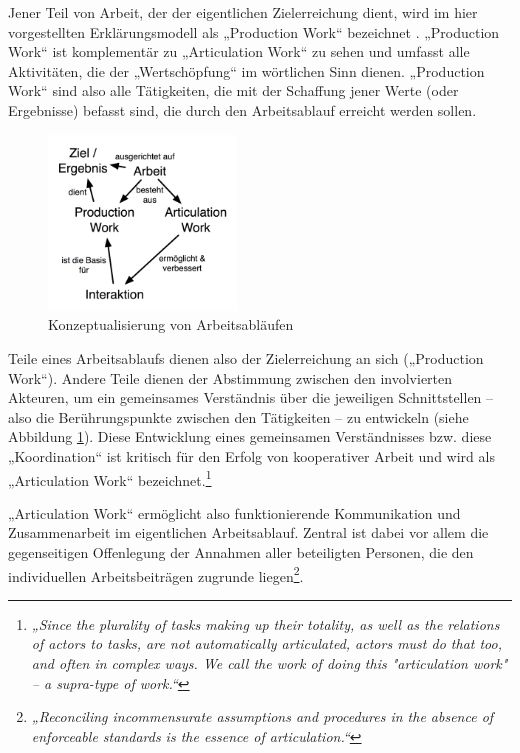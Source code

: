 Jener Teil von Arbeit, der der eigentlichen Zielerreichung dient, wird im hier vorgestellten Erklärungsmodell als „Production Work“ bezeichnet \citep{Fujimura87}. „Production Work“ ist komplementär zu „Articulation Work“ zu sehen und umfasst alle Aktivitäten, die der „Wertschöpfung“ im wörtlichen Sinn dienen. „Production Work“ sind also alle Tätigkeiten, die mit der Schaffung jener Werte (oder Ergebnisse) befasst sind, die durch den Arbeitsablauf erreicht werden sollen.  

\begin{figure}[htbp]
	\centering
		\includegraphics[width=5cm]{img/ArticulationWork/ArbeitInteraktion.png}
	\caption{Konzeptualisierung von Arbeitsabläufen}
	\label{fig:img_ArticulationWork_ArbeitInteraktion}
\end{figure}

Teile eines Arbeitsablaufs dienen also der Zielerreichung an sich („Production Work“). Andere Teile dienen der Abstimmung zwischen den involvierten Akteuren, um ein gemeinsames Verständnis über die jeweiligen Schnittstellen -- also die Berührungspunkte zwischen den Tätigkeiten -- zu entwickeln (siehe Abbildung \ref{fig:img_ArticulationWork_ArbeitInteraktion}). Diese Entwicklung eines gemeinsamen Verständnisses bzw. diese „Koordination“ ist kritisch für den Erfolg von kooperativer Arbeit \citep{Strauss93} und wird als „Articulation Work“ bezeichnet.\footnote{\emph{„Since the plurality of tasks making up their totality, as well as the relations of actors to tasks, are not automatically articulated, actors must do that too, and often in complex ways. We call the work of doing this "articulation work" -- a supra-type of work.“}\citep{Strauss85}} 

„Articulation Work“ ermöglicht also funktionierende Kommunikation und Zusammenarbeit im eigentlichen Arbeitsablauf. Zentral ist dabei vor allem die gegenseitigen Offenlegung der Annahmen aller beteiligten Personen, die den individuellen Arbeitsbeiträgen zugrunde liegen\footnote{\emph{„Reconciling incommensurate assumptions and procedures in the absence of enforceable standards is the essence of articulation.“}\citep[][S. 266]{Gerson86}}. 

